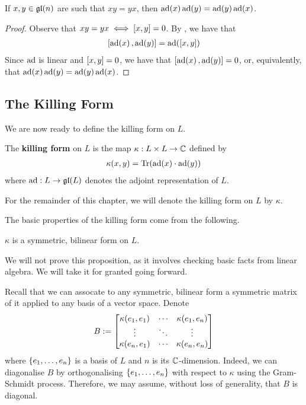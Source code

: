 \begin{lemma}
    If $x, y \in \mathfrak{gl}\!\left( n \right)$ are such that $xy = yx$, then $\operatorname{ad}\!\left( x \right) \operatorname{ad}\!\left( y \right) = \operatorname{ad}\!\left( y \right) \operatorname{ad}\!\left( x \right)$.
\end{lemma}
\begin{proof}
    Observe that $xy = yx \iff \left[ x, y \right] = 0$. By , we have that
    \begin{align*}
        \left[ \operatorname{ad}\!\left( x \right), \operatorname{ad}\!\left( y \right) \right] = \operatorname{ad}\!\left( \left[ x, y \right] \right)
    \end{align*}
    Since $\operatorname{ad}$ is linear and $\left[ x, y \right] = 0$, we have that $\left[ \operatorname{ad}\!\left( x \right), \operatorname{ad}\!\left( y \right) \right] = 0$, or, equivalently, that $\operatorname{ad}\!\left( x \right) \operatorname{ad}\!\left( y \right) = \operatorname{ad}\!\left( y \right) \operatorname{ad}\!\left( x \right)$.
\end{proof}



\subsection{The Killing Form}

We are now ready to define the killing form on $L$.

\begin{boxdefinition}
    The \textbf{killing form} on $L$ is the map $\kappa : L \times L \to \mathbb{C}$ defined by
    \begin{align}
        \kappa(x, y) = \operatorname{Tr}\!\left( \operatorname{ad}\!\left( x \right) \cdot \operatorname{ad}\!\left( y \right) \right)
    \end{align}
    where $\operatorname{ad} : L \to \mathfrak{gl}\!\left( L \right)$ denotes the adjoint representation of $L$.
\end{boxdefinition}

\begin{boxconvention}
    For the remainder of this chapter, we will denote the killing form on $L$ by $\kappa$.
\end{boxconvention}

The basic properties of the killing form come from the following.

\begin{boxproposition}
    $\kappa$ is a symmetric, bilinear form on $L$.
\end{boxproposition}

We will not prove this proposition, as it involves checking basic facts from linear algebra. We will take it for granted going forward.

Recall that we can assocate to any symmetric, bilinear form a symmetric matrix of it applied to any basis of a vector space. Denote
\begin{align}
    B := \begin{bmatrix}
        \kappa\!\left( e_1, e_1 \right) & \cdots & \kappa\!\left( e_1, e_n \right) \\
        \vdots & \ddots & \vdots \\
        \kappa\!\left( e_n, e_1 \right) & \cdots & \kappa\!\left( e_n, e_n \right)
    \end{bmatrix}
\end{align}
where $\left\{ e_1, \ldots, e_n \right\}$ is a basis of $L$ and $n$ is its $\mathbb{C}$-dimension. Indeed, we can diagonalise $B$ by orthogonalising $\left\{ e_1, \ldots, e_n \right\}$ with respect to $\kappa$ using the Gram-Schmidt process. Therefore, we may assume, without loss of generality, that $B$ is diagonal.


